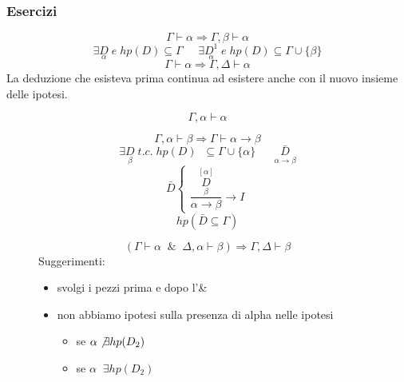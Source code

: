 \documentclass{article}
\theoremstyle{break}
\theoremstyle{break}
\theoremstyle{break}
\theoremstyle{break}
\begin{document}
    \subsubsection{Esercizi}
\begin{exercise}
    \[
    \Gamma \vdash \alpha \Rightarrow \Gamma,\beta \vdash \alpha
    \] 
    \[
        \exists \underset{\alpha}{D}\; e\; hp(D) \subseteq \Gamma \;\;\;\;\; \exists \underset{\alpha}{D^1} \; e \; hp(D) \subseteq \Gamma \cup \{\beta\} 
    \] 
    \[
    \Gamma \vdash \alpha \Rightarrow \Gamma, \Delta \vdash \alpha
    \] 
    La deduzione che esisteva prima continua ad esistere anche con il nuovo insieme delle ipotesi.
\end{exercise}
\begin{exercise}[a casa]
    \[
    \Gamma, \alpha \vdash \alpha
    \] 
\end{exercise}
\begin{exercise}
    \[
    \Gamma,\alpha \vdash \beta \Rightarrow \Gamma \vdash \alpha \to \beta
    \] 
\[
    \exists \underset{\beta}{D}\; t.c.\; hp(D)\;\; \subseteq \Gamma \cup \{\alpha\} \;\;\;\;\;\; \bar{\underset{\alpha \to \beta}{D}} 
\] 
\[
    \bar{D} \begin{cases}
      \dfrac{\underset{\beta}{\stackrel{[\alpha]}{D}}}{\alpha \to \beta} \to I
    \end{cases}
\] 
\[
    hp(\bar{D} \subseteq \Gamma)
\] 
\end{exercise}
\begin{figure}[H]
    \begin{exercise}[a casa]
        \[
            (\Gamma \vdash \alpha\;\; \&\;\; \Delta, \alpha \vdash \beta) \Rightarrow \Gamma, \Delta \vdash \beta
        \] 
        Suggerimenti:
        \begin{itemize}
            \item svolgi i pezzi prima e dopo l'\&
            \item non abbiamo ipotesi sulla presenza di alpha nelle ipotesi
                \begin{itemize}
                    \item se \( \alpha \not\exists hp(D_2)  \) 
                    \item se \( \alpha\;\; \exists hp(D_2)  \) 
                \end{itemize}
        \end{itemize}

    \end{exercise}
\end{figure}
\end{document}
